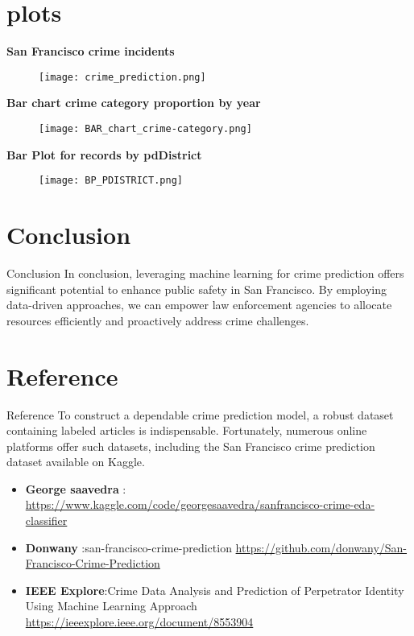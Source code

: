 \documentclass{beamer}
\begin{document}
\section{plots}
\begin{frame}
\centering
\textbf{San Francisco crime incidents}
\begin{figure}
    
    \texttt{[image: crime\_prediction.png]}
    \label{fig:enter-label}
\end{figure}
\textbf{Bar chart crime category proportion by year}
\begin{figure}
    \centering
    \texttt{[image: BAR\_chart\_crime-category.png]}
    \label{fig:enter-label}
\end{figure}
\textbf{Bar Plot for records by pdDistrict}
\begin{figure}
    \centering
    \texttt{[image: BP\_PDISTRICT.png]}
    \label{fig:enter-label}
\end{figure}

 
\end{frame}



\section{Conclusion}
\begin{frame}{Conclusion}
 In conclusion, leveraging machine learning for crime prediction offers significant potential to enhance public safety in San Francisco. By employing data-driven approaches, we can empower law enforcement agencies to allocate resources efficiently and proactively address crime challenges.
 
\end{frame}
\section{Reference}
\begin{frame}{Reference}
  To construct a dependable crime prediction model, a robust dataset containing labeled articles is indispensable. Fortunately, numerous online platforms offer such datasets, including the San Francisco crime prediction dataset available on Kaggle.
  \begin{itemize}
    
  
  
 \item \textbf{George saavedra} : \href{}{ https://www.kaggle.com/code/georgesaavedra/sanfrancisco-crime-eda-classifier}
 \item \textbf{Donwany} :san-francisco-crime-prediction 
 \href{}{https://github.com/donwany/San-Francisco-Crime-Prediction}
 \item \textbf{IEEE Explore}:Crime Data Analysis and Prediction of Perpetrator Identity Using Machine Learning Approach 
 \href{}{https://ieeexplore.ieee.org/document/8553904}



\end{itemize}
\end{frame}
\end{document}
